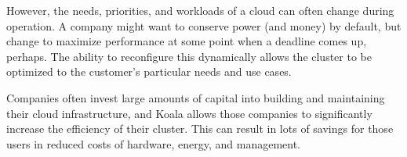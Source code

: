   However, the needs, priorities, and workloads of a cloud can often change during operation.  A company might want to conserve power (and money) by default, but change to maximize performance at some point when a deadline comes up, perhaps.  The ability to reconfigure this dynamically allows the cluster to be optimized to the customer's particular needs and use cases.

  Companies often invest large amounts of capital into building and maintaining their cloud infrastructure, and Koala allows those companies to significantly increase the efficiency of their cluster.  This can result in lots of savings for those users in reduced costs of hardware, energy, and management.
